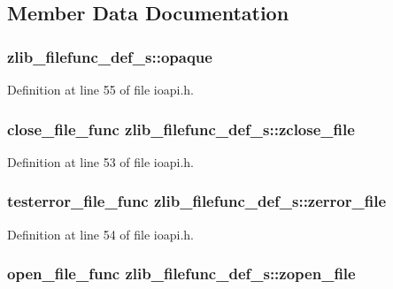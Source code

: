 \subsection{Member Data Documentation}
\hypertarget{structzlib__filefunc__def__s_a494b6d634b61bdc7fc7caed8e4fbe3f4}{
\subsubsection[{opaque}]{ zlib\-\_\-filefunc\-\_\-def\-\_\-s\-::opaque}}\label{structzlib__filefunc__def__s_a494b6d634b61bdc7fc7caed8e4fbe3f4}


Definition at line 55 of file ioapi.\-h.

\hypertarget{structzlib__filefunc__def__s_ac46ac7ec0540dce117dab3f210d26763}{
\subsubsection[{zclose\-\_\-file}]{\setlength{\rightskip}{0pt plus 5cm}close\-\_\-file\-\_\-func zlib\-\_\-filefunc\-\_\-def\-\_\-s\-::zclose\-\_\-file}}\label{structzlib__filefunc__def__s_ac46ac7ec0540dce117dab3f210d26763}


Definition at line 53 of file ioapi.\-h.

\hypertarget{structzlib__filefunc__def__s_a61182b5b3ff83fb509b57ab4d2d9816d}{
\subsubsection[{zerror\-\_\-file}]{\setlength{\rightskip}{0pt plus 5cm}testerror\-\_\-file\-\_\-func zlib\-\_\-filefunc\-\_\-def\-\_\-s\-::zerror\-\_\-file}}\label{structzlib__filefunc__def__s_a61182b5b3ff83fb509b57ab4d2d9816d}


Definition at line 54 of file ioapi.\-h.

\hypertarget{structzlib__filefunc__def__s_a49b78a559140e495b94af4d9dfe5c4e9}{
\subsubsection[{zopen\-\_\-file}]{\setlength{\rightskip}{0pt plus 5cm}open\-\_\-file\-\_\-func zlib\-\_\-filefunc\-\_\-def\-\_\-s\-::zopen\-\_\-file}}\label{structzlib__filefunc__def__s_a49b78a559140e495b94af4d9dfe5c4e9}


